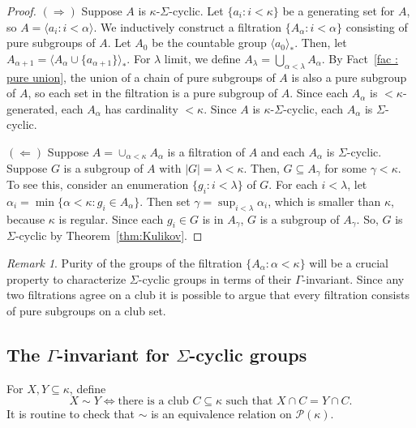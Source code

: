 \documentclass[a4paper]{amsart}
\theoremstyle{definition}
\theoremstyle{remark}
\newtheorem{remark}[theorem]{Remark}
\numberwithin{equation}{section}
\begin{document}
\begin{proof}
    \((\Rightarrow)\) Suppose $A$ is $\kappa$-$\Sigma$-cyclic. Let $\{a_i : i < \kappa\}$ be a generating set for $A$, so $A = \langle a_i : i < \alpha \rangle$.
    We inductively construct a filtration $\{ A_{\alpha} : i < \alpha\}$ consisting of pure subgroups of \(A\). Let \(A_0\)  be the countable group \(\langle a_0\rangle_*\). Then, let \(A_{\alpha+1} = \langle A_\alpha \cup \{a_{\alpha+1}\}\rangle_*\). For \(\lambda\) limit, we define \(A_\lambda = \bigcup_{\alpha<\lambda} A_\alpha\). 
     By Fact~\ref{fac : pure union}, the union of a chain of pure subgroups of \(A\) is also a pure subgroup of \(A\), so each set in the filtration is a pure subgroup of $A$.
    Since each $A_{\alpha}$ is $<\!\kappa$-generated, each $A_{\alpha}$ has cardinality $<\!\kappa$. Since $A$ is $\kappa$-$\Sigma$-cyclic, each $A_{\alpha}$ is $\Sigma$-cyclic. 

    \((\Leftarrow)\) Suppose $A = \cup_{\alpha < \kappa} A_{\alpha}$ is a filtration of $A$ and each $A_{\alpha}$ is $\Sigma$-cyclic. Suppose $G$ is a subgroup of $A$ with \(|G|=\lambda<\kappa\). Then, $G \subseteq A_{\gamma}$ for some $\gamma < \kappa$.
    To see this, consider an enumeration \(\{g_i:i<\lambda\}\) of \(G\).
    For each \(i<\lambda\), let \(\alpha_i = \min \{\alpha<\kappa: g_i \in A_{\alpha}\}\). Then set \(\gamma = \sup_{i<\lambda} \alpha_i\), which is smaller than \(\kappa\), because \(\kappa\) is regular. Since each $g_i \in G$ is in $A_{\gamma}$, $G$ is a subgroup of $A_{\gamma}$.
    So, $G$ is $\Sigma$-cyclic by Theorem~\ref{thm:Kulikov}.
\end{proof}


\begin{remark}
    Purity of the groups of the filtration \(\{A_\alpha:\alpha<\kappa\}\) will be a crucial property to characterize \(\Sigma\)-cyclic groups in terms of their \(\Gamma\)-invariant. Since any two filtrations agree on a club it is possible to argue that every filtration consists of pure subgroups on a club set.
\end{remark}

\subsection{The \(\Gamma\)-invariant for \(\Sigma\)-cyclic groups}

For \(X,Y\subseteq \kappa\), define
    \[
    X\sim Y \iff \text{there is a club \(C\subseteq \kappa\) such that \(X\cap C = Y\cap C\)}.
    \]
    It is routine to check that \(\sim\) is an equivalence relation on \(\mathcal{P}(\kappa)\).
\end{document}
